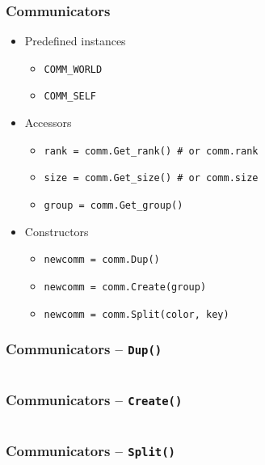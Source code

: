 \begin{frame}
  \frametitle{Communicators}
  \linebreak
  \begin{itemize}
  \item Predefined instances
    \begin{itemize}
    \item \texttt{COMM\_WORLD}
    \item \texttt{COMM\_SELF}
    \end{itemize}
  \item Accessors
    \begin{itemize}
    \item \texttt{rank = comm.Get\_rank() \# or comm.rank}
    \item \texttt{size = comm.Get\_size() \# or comm.size}
    \item \texttt{group = comm.Get\_group()}
    \end{itemize}
  \item Constructors\\
    \begin{itemize}
    \item \texttt{newcomm = comm.Dup()}
    \item \texttt{newcomm = comm.Create(group)}
    \item \texttt{newcomm = comm.Split(color, key)}
    \end{itemize}
  \end{itemize}
\end{frame}

\begin{frame}[t]
  \frametitle{Communicators -- \texttt{Dup()}}
  \inputminted[linenos]{python}{comm_dup.py}
\end{frame}

\begin{frame}[t]
  \frametitle{Communicators -- \texttt{Create()}}
  \inputminted[linenos]{python}{comm_create.py}
\end{frame}

\begin{frame}[t]
  \frametitle{Communicators -- \texttt{Split()}}
  \inputminted[linenos]{python}{comm_split.py}
\end{frame}

